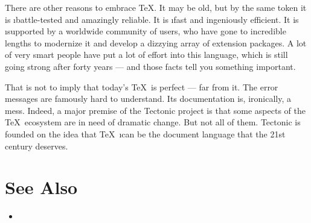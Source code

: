 There are other reasons to embrace \TeX. It may be old, but by the same token it
is \i{battle-tested} and amazingly reliable. It is \i{fast} and ingeniously
efficient. It is \i{supported} by a worldwide community of users, who have gone
to incredible lengths to modernize it and develop a dizzying array of extension
packages. A lot of very smart people have put a lot of effort into this
language, which is still going strong after forty years — and those facts tell
you something important.

That is not to imply that today's \TeX\ is perfect — far from it. The error
messages are famously hard to understand. Its documentation is, ironically, a
mess. Indeed, a major premise of the Tectonic project is that some aspects of
the \TeX\ ecosystem are in need of dramatic change. But not all of them.
Tectonic is founded on the idea that \TeX\ \i{can be} the document language that
the 21st century deserves.

\section*{See Also}

\begin{itemize}
  \item {}
\end{itemize}